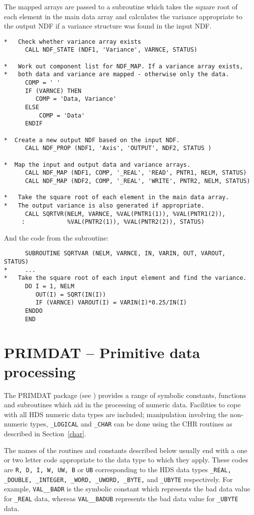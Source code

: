 The mapped arrays are passed to a subroutine which takes the square root of
each element in the main data array and calculates the variance appropriate
to the output NDF if a variance structure was found  in the input NDF.
\begin{verbatim}
*   Check whether variance array exists
      CALL NDF_STATE (NDF1, 'Variance', VARNCE, STATUS)

*   Work out component list for NDF_MAP. If a variance array exists, 
*   both data and variance are mapped - otherwise only the data.
      COMP = ' '
      IF (VARNCE) THEN
         COMP = 'Data, Variance'
      ELSE
          COMP = 'Data'
      ENDIF

*  Create a new output NDF based on the input NDF. 
      CALL NDF_PROP (NDF1, 'Axis', 'OUTPUT', NDF2, STATUS )

*  Map the input and output data and variance arrays.
      CALL NDF_MAP (NDF1, COMP, '_REAL', 'READ', PNTR1, NELM, STATUS)
      CALL NDF_MAP (NDF2, COMP, '_REAL', 'WRITE', PNTR2, NELM, STATUS)

*   Take the square root of each element in the main data array.
*   The output variance is also generated if appropriate.
      CALL SQRTVR(NELM, VARNCE, %VAL(PNTR1(1)), %VAL(PNTR1(2)), 
     :            %VAL(PNTR2(1)), %VAL(PNTR2(2)), STATUS)
\end{verbatim}
And the code from the subroutine:
\begin{verbatim}
      SUBROUTINE SQRTVAR (NELM, VARNCE, IN, VARIN, OUT, VAROUT, STATUS)
*     ...
*   Take the square root of each input element and find the variance.
      DO I = 1, NELM
         OUT(I) = SQRT(IN(I))
         IF (VARNCE) VAROUT(I) = VARIN(I)*0.25/IN(I)
      ENDDO
      END
\end{verbatim}

\newpage
\section{PRIMDAT -- Primitive data processing\label{prim}}

The PRIMDAT package (see ) provides a range of symbolic
constants, functions and subroutines which aid in the processing of numeric
data. 
Facilities to cope with all HDS numeric data types 
are included;
manipulation involving the non-numeric types, {\tt \_LOGICAL} and {\tt\_CHAR}
can be done using the CHR routines as described in Section~\ref{char}.

The names of the routines and constants described below usually end with a
one or two letter code appropriate to the data type to which they apply.
These codes are {\tt R, D, I, W, UW, B} or {\tt UB}  corresponding to the 
HDS data types {\tt \_REAL,
\_DOUBLE, \_INTEGER, \_WORD, \_UWORD, \_BYTE,} and {\tt\_UBYTE} respectively.
For example, {\tt VAL\_\_BADR} is the symbolic constant which represents the bad
data value for  {\tt\_REAL} data, whereas {\tt VAL\_\_BADUB} represents the bad
data value for {\tt\_UBYTE} data. 


